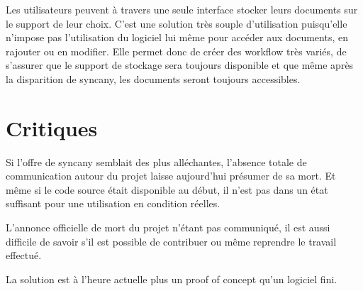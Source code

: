 \vspace{1cm}

Les utilisateurs peuvent à travers une seule interface stocker leurs documents sur le support de leur choix. C'est une solution très souple d'utilisation puisqu'elle n'impose pas l'utilisation du logiciel lui même pour accéder aux documents, en rajouter ou en modifier. Elle permet donc de créer des workflow très variés, de s'assurer que le support de stockage sera toujours disponible et que même après la disparition de syncany, les documents seront toujours accessibles.

\section{Critiques}
Si l'offre de syncany semblait des plus alléchantes, l'absence totale de communication autour du projet laisse aujourd'hui présumer de sa mort. Et même si le code source était disponible au début, il n'est pas dans un état suffisant pour une utilisation en condition réelles.

L'annonce officielle de mort du projet n'étant pas communiqué, il est aussi difficile de savoir s'il est possible de contribuer ou même reprendre le travail effectué.

La solution est à l'heure actuelle plus un proof of concept qu'un logiciel fini.
